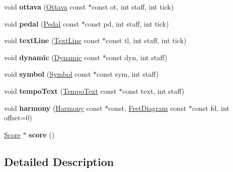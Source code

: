 \begin{DoxyCompactItemize}
void {\bfseries ottava} (\hyperlink{class_ms_1_1_ottava}{Ottava} const $\ast$const ot, int staff, int tick)
\item 
\mbox{\label{class_ms_1_1_export_music_xml_ad1e86781063f5feb360914e667006471}} 
void {\bfseries pedal} (\hyperlink{class_ms_1_1_pedal}{Pedal} const $\ast$const pd, int staff, int tick)
\item 
\mbox{\label{class_ms_1_1_export_music_xml_abd16232edbcfa06ce9f95e19e3d3184e}} 
void {\bfseries text\+Line} (\hyperlink{class_ms_1_1_text_line}{Text\+Line} const $\ast$const tl, int staff, int tick)
\item 
\mbox{\label{class_ms_1_1_export_music_xml_a640671bceb30cacdf00f2af2563fdcf5}} 
void {\bfseries dynamic} (\hyperlink{class_ms_1_1_dynamic}{Dynamic} const $\ast$const dyn, int staff)
\item 
\mbox{\label{class_ms_1_1_export_music_xml_a65f63ab697bf6ad320b221625e8a6bdf}} 
void {\bfseries symbol} (\hyperlink{class_ms_1_1_symbol}{Symbol} const $\ast$const sym, int staff)
\item 
\mbox{\label{class_ms_1_1_export_music_xml_a00d1a5001ea155dbc8d59e50f700d4bf}} 
void {\bfseries tempo\+Text} (\hyperlink{class_ms_1_1_tempo_text}{Tempo\+Text} const $\ast$const text, int staff)
\item 
\mbox{\label{class_ms_1_1_export_music_xml_a07acf86b6180a86b8196d39990ba115b}} 
void {\bfseries harmony} (\hyperlink{class_ms_1_1_harmony}{Harmony} const $\ast$const, \hyperlink{class_ms_1_1_fret_diagram}{Fret\+Diagram} const $\ast$const fd, int offset=0)
\item 
\mbox{\label{class_ms_1_1_export_music_xml_ac9b5a76a326ac14c7c0f4c53e64265bc}} 
\hyperlink{class_ms_1_1_score}{Score} $\ast$ {\bfseries score} ()
\end{DoxyCompactItemize}


\subsection{Detailed Description}


